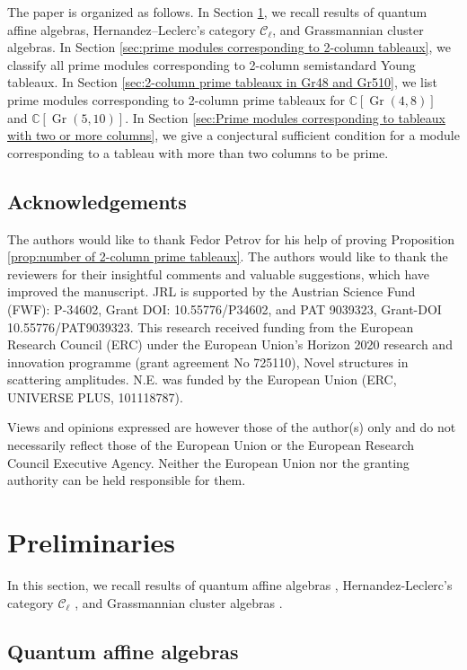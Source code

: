 \documentclass[12pt, reqno]{amsart}
\theoremstyle{plain}
\theoremstyle{definition}
\numberwithin{equation}{section}
\newcommand{\CC}{{\mathbb {C}}}
\DeclareMathOperator{\Gr}{Gr}
\begin{document}
The paper is organized as follows. In Section \ref{sec:preliminaries}, we recall results of quantum affine algebras, Hernandez--Leclerc's category $\mathcal{C}_{\ell}$, and Grassmannian cluster algebras. In Section \ref{sec:prime modules corresponding to 2-column tableaux}, we classify all prime modules corresponding to 2-column semistandard Young tableaux. In Section \ref{sec:2-column prime tableaux in Gr48 and Gr510}, we list prime modules corresponding to 2-column prime tableaux for $\CC[\Gr(4,8)]$ and $\CC[\Gr(5,10)]$. In Section \ref{sec:Prime modules corresponding to tableaux with two or more columns}, we give a conjectural sufficient condition for a module corresponding to a tableau with more than two columns to be prime. 

\subsection*{Acknowledgements}
The authors would like to thank Fedor Petrov for his help of proving Proposition \ref{prop:number of 2-column prime tableaux}. The authors would like to thank the reviewers for their insightful comments and valuable suggestions, which have improved the manuscript. JRL is supported by the Austrian Science Fund (FWF): P-34602, Grant DOI: 10.55776/P34602, and PAT 9039323, Grant-DOI 10.55776/PAT9039323. This research received funding from the European Research Council (ERC) under the European Union’s Horizon 2020 research and innovation programme (grant agreement No 725110), Novel structures in scattering amplitudes. N.E. was funded by the European Union (ERC, UNIVERSE PLUS, 101118787). \begin{tiny}
Views and opinions expressed are however those of the author(s) only and do not necessarily reflect those of the European Union or the European Research Council Executive Agency. Neither the European Union nor the granting authority can be held responsible for them.
\end{tiny}  

\section{Preliminaries} \label{sec:preliminaries}
In this section, we recall results of quantum affine algebras \cite{CP94, FR98}, Hernandez-Leclerc's category $\mathcal{C}_{\ell}$ \cite{HL10}, and Grassmannian cluster algebras \cite{Sco06, CDFL}. 

\subsection{Quantum affine algebras} \label{subsec:quantum affine algebras}
\end{document}
